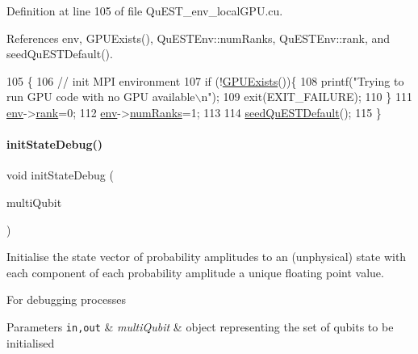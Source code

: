 Definition at line 105 of file Qu\+E\+S\+T\+\_\+env\+\_\+local\+G\+P\+U.\+cu.



References env, G\+P\+U\+Exists(), Qu\+E\+S\+T\+Env\+::num\+Ranks, Qu\+E\+S\+T\+Env\+::rank, and seed\+Qu\+E\+S\+T\+Default().


\begin{DoxyCode}
105                                 \{
106     \textcolor{comment}{// init MPI environment}
107     \textcolor{keywordflow}{if} (!\mbox{\hyperlink{QuEST__env__localGPU_8cu_a0aabd5ed69a74e5bc0b46a17af45c886}{GPUExists}}())\{
108         printf(\textcolor{stringliteral}{"Trying to run GPU code with no GPU available\(\backslash\)n"});
109         exit(EXIT\_FAILURE);
110     \}
111     \mbox{\hyperlink{runTests_8c_a5fd8ba97fcae3408ae6221dfc3cc1f93}{env}}->\mbox{\hyperlink{structQuESTEnv_aa648bb336cf8598467cb62db00b9cee8}{rank}}=0;
112     \mbox{\hyperlink{runTests_8c_a5fd8ba97fcae3408ae6221dfc3cc1f93}{env}}->\mbox{\hyperlink{structQuESTEnv_af22aacd7c9905accae28484785c193b4}{numRanks}}=1;
113         
114         \mbox{\hyperlink{QuEST_8c_ab0ab3ec70938712c26988a6aa51263a0}{seedQuESTDefault}}();
115 \}
\end{DoxyCode}
\mbox{\label{QuEST__env__localGPU_8cu_a4b737ff9b4267609ef27e6cb4c42dc68}} 
\paragraph{\texorpdfstring{init\+State\+Debug()}{initStateDebug()}}
{\footnotesize\ttfamily void init\+State\+Debug (\begin{DoxyParamCaption}\item[{\mbox{\hyperlink{structMultiQubit}{Multi\+Qubit}}}]{multi\+Qubit }\end{DoxyParamCaption})}



Initialise the state vector of probability amplitudes to an (unphysical) state with each component of each probability amplitude a unique floating point value. 

For debugging processes 
\begin{DoxyParams}[1]{Parameters}
\mbox{\tt in,out}  & {\em multi\+Qubit} & object representing the set of qubits to be initialised \\
\hline
\end{DoxyParams}


